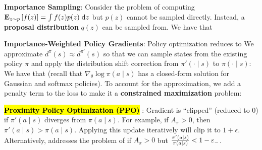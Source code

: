 \documentclass{article}
\begin{document}
  \textbf{Importance Sampling}: Consider the problem of computing $\mathbf{E}_{z\sim p}\left[ f(z)\right]=\int f(z)p(z)\;\mathrm{d} z$ but $p(z)$ cannot be sampled directly. Instead, a \textbf{proposal distribution} $q(z)$ can be sampled from. We have that

  \textbf{Importance-Weighted Policy Gradients}: Policy optimization reduces to 
  We approximate $d^\pi(s)\approx d^{\pi'}(s)$ so that we can sample states from the existing policy $\pi$ and apply the distribution shift correction from $\pi'(\cdot\mid s)$ to $\pi(\cdot\mid s)$:
  We have that
  (recall that $\nabla_\theta \log\pi(a\mid s)$ has a closed-form solution for Gaussian and softmax policies). To account for the approximation, we add a penalty term to the loss to make it a \textbf{constrained maximization} problem:

  \hl{\textbf{Proximity Policy Optimization (PPO)}} \cite{schulman2017proximal}: Gradient is ``clipped'' (reduced to 0) if $\pi'(a\mid s)$ diverges from $\pi(a\mid s)$. 
  For example, if $A_\pi>0$, then $\pi'(a\mid s)>\pi(a\mid s)$. Applying this update iteratively will clip it to $1+\epsilon$. Alternatively,
  addresses the problem of if $A_\pi>0$ but $\frac{\pi'(a\mid s)}{\pi(a\mid s)}<1-\varepsilon_-$.
\end{document}
